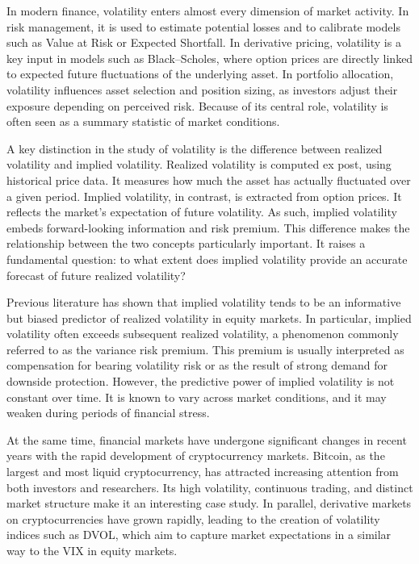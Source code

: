 \documentclass[11pt,a4paper,openany]{report}
\begin{document}
In modern finance, volatility enters almost every dimension of market
activity. In risk management, it is used to estimate potential losses
and to calibrate models such as Value at Risk or Expected Shortfall. In
derivative pricing, volatility is a key input in models such as
Black--Scholes, where option prices are directly linked to expected
future fluctuations of the underlying asset. In portfolio allocation,
volatility influences asset selection and position sizing, as investors
adjust their exposure depending on perceived risk. Because of its
central role, volatility is often seen as a summary statistic of market
conditions.

A key distinction in the study of volatility is the difference between
realized volatility and implied volatility. Realized volatility is
computed ex post, using historical price data. It measures how much the
asset has actually fluctuated over a given period. Implied volatility,
in contrast, is extracted from option prices. It reflects the market's
expectation of future volatility. As such, implied volatility embeds
forward-looking information and risk premium. This difference makes the
relationship between the two concepts particularly important. It raises
a fundamental question: to what extent does implied volatility provide
an accurate forecast of future realized volatility?

Previous literature has shown that implied volatility tends to be an
informative but biased predictor of realized volatility in equity
markets. In particular, implied volatility often exceeds subsequent
realized volatility, a phenomenon commonly referred to as the variance
risk premium. This premium is usually interpreted as compensation for
bearing volatility risk or as the result of strong demand for downside
protection. However, the predictive power of implied volatility is not
constant over time. It is known to vary across market conditions, and it
may weaken during periods of financial stress.

At the same time, financial markets have undergone significant changes
in recent years with the rapid development of cryptocurrency markets.
Bitcoin, as the largest and most liquid cryptocurrency, has attracted
increasing attention from both investors and researchers. Its high
volatility, continuous trading, and distinct market structure make it an
interesting case study. In parallel, derivative markets on
cryptocurrencies have grown rapidly, leading to the creation of
volatility indices such as DVOL, which aim to capture market
expectations in a similar way to the VIX in equity markets.
\end{document}

